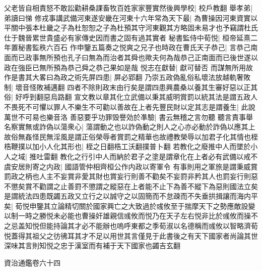 父老皆自相責怒不敢訟勸耕桑課畜牧百姓家家豐實然後興學校|{
	校戶教翻}
舉孝弟|{
	弟讀曰悌}
修戎事講武備河東遂安畿在河東十六年常為天下最|{
	為曹操因河東資實以平關中張本杜畿之子為杜恕恕之子為杜預其守河東觀其方略固未易才也予竊謂杜氏仕于魏晉累世貴盛必有家傳史因而書之固有過其實者}
秘書監侍中荀悦|{
	桓帝延熹二年置秘書監秩六百石}
作申鑒五篇奏之悦爽之兄子也時政在曹氏天子恭己|{
	言恭己南面而已政事無所預也孔子曰無為而治者其舜也歟夫何為哉恭己正南面而已後世遂以政在強臣已無所預為恭己舜之恭己果如是哉}
悦志在獻替|{
	獻可替否}
而謀無所用故作是書其大畧曰為政之術先屏四患|{
	屏必郢翻}
乃崇五政偽亂俗私壞法放越軌奢敗制|{
	壞音怪敗補邁翻}
四者不除則政末由行矣是謂四患興農桑以養其生審好惡以正其俗|{
	好呼到翻惡烏路翻}
宣文教以章其化立武備以秉其威明賞罰以統其法是謂五政人不畏死不可懼以罪人不樂生不可勸以善故在上者先豐民財以定其志是謂養生|{
	此說萬世不可易也樂音洛}
善惡要乎功罪毁譽効於凖驗|{
	書云無稽之言勿聽}
聽言責事舉名察實無或詐偽以蕩衆心|{
	蕩謂動之也以詐偽動之則人之心亦必動於詐偽以應其上}
故俗無姦怪民無淫風是謂正俗榮辱者賞罰之精華也故禮教榮辱以加君子化其情也桎梏鞭撲以加小人化其形也|{
	桎之日翻梏工沃翻撲普卜翻}
若教化之廢推中人而墜於小人之域|{
	推吐雷翻}
教化之行引中人而納於君子之塗是謂章化在上者必有武備以戒不虞安居則寄之内政|{
	國語管仲相齊桓公作内政以寄軍令}
有事則用之軍旅是謂秉威賞罰政之柄也人主不妄賞非愛其財也賞妄行則善不勸矣不妄罸非矜其人也罰妄行則惡不懲矣賞不勸謂之止善罸不懲謂之縱惡在上者能不止下為善不縱下為惡則國法立矣是謂統法四患既蠲五政又立行之以誠守之以固簡而不怠疎而不失垂拱揖讓而海内平矣|{
	荀悦申鑒其立論精切關於國家興亡之大致過於彧攸至于揣摩天下之勢應敵設變以制一時之勝悦未必能也曹操奸雄親信彧攸而悦乃在天子左右悦非比於彧攸而操不之忌盖知悦但能持論其才必不能辦也嗚呼東都之季荀淑以名德稱而彧攸以智略濟荀悦蓋得其祖父之彷彿耳其才不足以用世其言僅見于此書後之有天下國家者尚論其世深味其言則知悦之忠于漢室而有補于天下國家也蠲吉玄翻}


資治通鑑卷六十四
